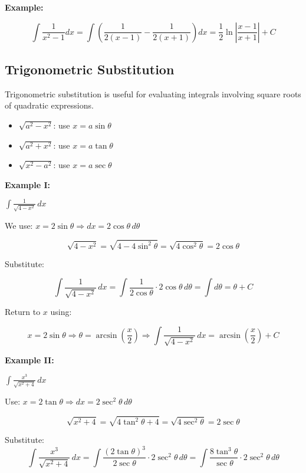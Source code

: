 \textbf{Example:}

\[
    \int \frac{1}{x^2 - 1} dx = \int \left( \frac{1}{2(x - 1)} - \frac{1}{2(x + 1)} \right) dx 
    = \frac{1}{2} \ln\left|\frac{x - 1}{x + 1}\right| + C
\]

\subsection{Trigonometric Substitution}

Trigonometric substitution is useful for evaluating integrals involving square roots of quadratic 
expressions.

\begin{itemize}

    \item \(\sqrt{a^2 - x^2}\): use \(x = a \sin \theta\)

    \item \(\sqrt{a^2 + x^2}\): use \(x = a \tan \theta\)

    \item \(\sqrt{x^2 - a^2}\): use \(x = a \sec \theta\)

\end{itemize}

\textbf{Example I:}

\( \int \frac{1}{\sqrt{4 - x^2}} \,dx \)

We use: \( x = 2\sin \theta \Rightarrow dx = 2\cos \theta\, d\theta \)

\[
    \sqrt{4 - x^2} = \sqrt{4 - 4\sin^2 \theta} = \sqrt{4\cos^2 \theta} = 2\cos \theta
\]

Substitute:

\[
    \int \frac{1}{\sqrt{4 - x^2}} \,dx = \int \frac{1}{2\cos \theta} \cdot 2\cos \theta \,d\theta = 
    \int d\theta = \theta + C
\]

Return to \(x\) using:

\[
    x = 2\sin \theta \Rightarrow \theta = \arcsin\left(\frac{x}{2}\right)
    \Rightarrow \int \frac{1}{\sqrt{4 - x^2}} \,dx = \arcsin\left(\frac{x}{2}\right) + C
\]

\textbf{Example II:} 

\( \int \frac{x^3}{\sqrt{x^2 + 4}} \,dx \)

Use: \( x = 2\tan \theta \Rightarrow dx = 2\sec^2 \theta\, d\theta \)

\[
    \sqrt{x^2 + 4} = \sqrt{4\tan^2 \theta + 4} = \sqrt{4\sec^2 \theta} = 2\sec \theta
\]

Substitute:
\[
    \int \frac{x^3}{\sqrt{x^2 + 4}}\,dx = \int \frac{{(2\tan \theta)}^3}{2\sec \theta} \cdot 2\sec^2 \theta\, d\theta
    = \int \frac{8\tan^3 \theta}{\sec \theta} \cdot 2\sec^2 \theta\, d\theta
\]

